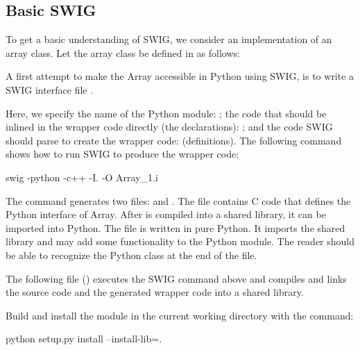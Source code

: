\subsection{Basic SWIG}
To get a basic understanding of SWIG, we consider  an implementation of an array class. 
Let the array class be defined in  as follows:

A first attempt to make the Array accessible in Python using SWIG, is to write a SWIG interface file .

Here, we specify the name of the Python module: ; the code
that should be inlined in the wrapper code directly (the declarations):
; and the code SWIG should parse to create the wrapper code:  (definitions). The following command shows how to run SWIG to produce the wrapper code:
\begin{bash}
swig -python -c++ -I. -O Array_1.i
\end{bash}
The command generates two files:  and
. The file
 contains C code that defines the Python
interface of Array.  After  is compiled into a
shared library, it can be imported into Python. 
The file  is written in pure Python.  It imports the shared library and may add some
functionality to the Python module. 
The reader should be able to recognize the Python class  at the end of the  file. 

The following \citet{www:distutils} file () executes the SWIG command above and compiles and links the source code and the generated wrapper code into a shared library.

Build and install the module in the current working directory with the
command:
\begin{bash}
python setup.py install --install-lib=.
\end{bash}


